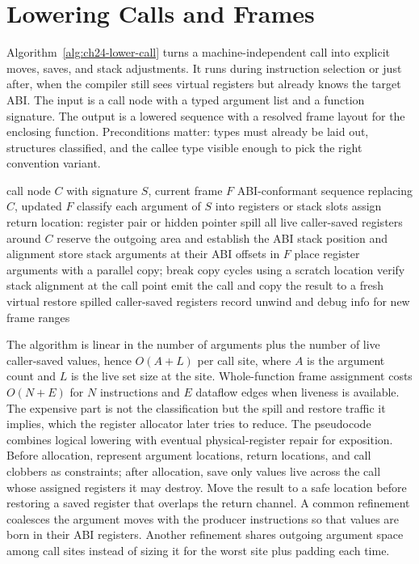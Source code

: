 \section{Lowering Calls and Frames}\label{sec:ch24-algorithm}

Algorithm~\ref{alg:ch24-lower-call} turns a machine-independent call into explicit moves, saves, and stack adjustments.
It runs during instruction selection or just after, when the compiler still sees virtual registers but already knows the target ABI.
The input is a call node with a typed argument list and a function signature.
The output is a lowered sequence with a resolved frame layout for the enclosing function.
Preconditions matter: types must already be laid out, structures classified, and the callee type visible enough to pick the right convention variant.

\begin{algorithm}[htbp]
\caption{Lower a call and fix the enclosing frame}\label{alg:ch24-lower-call}
\begin{pseudocode}
\Require call node $C$ with signature $S$, current frame $F$
\Ensure ABI-conformant sequence replacing $C$, updated $F$
\State classify each argument of $S$ into registers or stack slots
\State assign return location: register pair or hidden pointer
\State spill all live caller-saved registers around $C$
\State reserve the outgoing area and establish the ABI stack position and alignment
\State store stack arguments at their ABI offsets in $F$
\State place register arguments with a parallel copy; break copy cycles using a scratch location
\State verify stack alignment at the call point
\State emit the call and copy the result to a fresh virtual
\State restore spilled caller-saved registers
\State record unwind and debug info for new frame ranges
\end{pseudocode}
\end{algorithm}

The algorithm is linear in the number of arguments plus the number of live caller-saved values, hence $O(A + L)$ per call site, where $A$ is the argument count and $L$ is the live set size at the site.
Whole-function frame assignment costs $O(N + E)$ for $N$ instructions and $E$ dataflow edges when liveness is available.
The expensive part is not the classification but the spill and restore traffic it implies, which the register allocator later tries to reduce.
The pseudocode combines logical lowering with eventual physical-register repair for exposition.
Before allocation, represent argument locations, return locations, and call clobbers as constraints; after allocation, save only values live across the call whose assigned registers it may destroy.
Move the result to a safe location before restoring a saved register that overlaps the return channel.
A common refinement coalesces the argument moves with the producer instructions so that values are born in their ABI registers.
Another refinement shares outgoing argument space among call sites instead of sizing it for the worst site plus padding each time.


